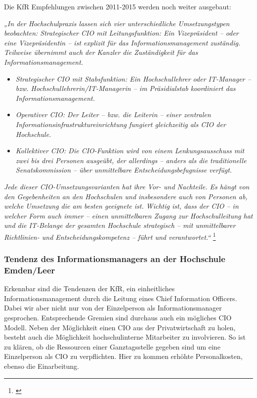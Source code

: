 Die KfR Empfehlungen zwischen 2011-2015 werden noch weiter ausgebaut:

\textit{„In der Hochschulpraxis lassen sich vier unterschiedliche Umsetzungstypen beobachten:  Strategischer CIO mit Leitungsfunktion: Ein Vizepräsident – oder eine Vizepräsidentin – ist explizit für das Informationsmanagement zuständig. Teilweise übernimmt auch der Kanzler die Zuständigkeit für das Informationsmanagement.}

	\begin{itemize}
		\item \textit{Strategischer CIO mit Stabsfunktion: Ein Hochschullehrer oder IT-Manager – 
			bzw. Hochschullehrerin/IT-Managerin – im Präsidialstab koordiniert das Informationsmanagement.} 
		\item \textit{Operativer CIO: Der Leiter – bzw. die Leiterin – einer zentralen 
			Informationsinfrastruktureinrichtung fungiert gleichzeitig als CIO der Hochschule.}
	    \item \textit{Kollektiver CIO: Die CIO-Funktion wird von einem Lenkungsausschuss mit zwei bis 
	    	drei Personen ausgeübt, der allerdings – anders als die traditionelle Senatskommission – über 
	    	unmittelbare Entscheidungsbefugnisse verfügt.}
	\end{itemize}
	\textit{Jede dieser CIO-Umsetzungsvarianten hat ihre Vor- und Nachteile. Es hängt von den 
		Gegebenheiten an den Hochschulen und insbesondere auch von Personen ab, welche 
		Umsetzung die am besten geeignete ist. Wichtig ist, dass der CIO – in welcher Form 
		auch immer – einen unmittelbaren Zugang zur Hochschulleitung hat und die IT-Belange 
		der gesamten Hochschule strategisch – mit unmittelbarer Richtlinien- und 
		Entscheidungskompetenz – führt und verantwortet.“} \footnote{\cite{lang_cios_2014}}

\subsubsection{Tendenz des Informationsmanagers an der Hochschule Emden/Leer}
Erkennbar sind die Tendenzen der KfR, ein einheitliches Informationsmanagement durch die Leitung eines 
Chief Information Officers. Dabei wir aber nicht nur von der Einzelperson als Informationsmanager gesprochen. 
Entsprechende Gremien sind durchaus auch ein mögliches CIO Modell. Neben der Möglichkeit einen CIO aus 
der Privatwirtschaft zu holen, besteht auch die Möglichkeit hochschulinterne Mitarbeiter zu involvieren. 
So ist zu klären, ob die Ressourcen einer Ganztagsstelle gegeben sind um eine Einzelperson als CIO zu 
verpflichten. Hier zu kommen erhöhte Personalkosten, ebenso die Einarbeitung.

